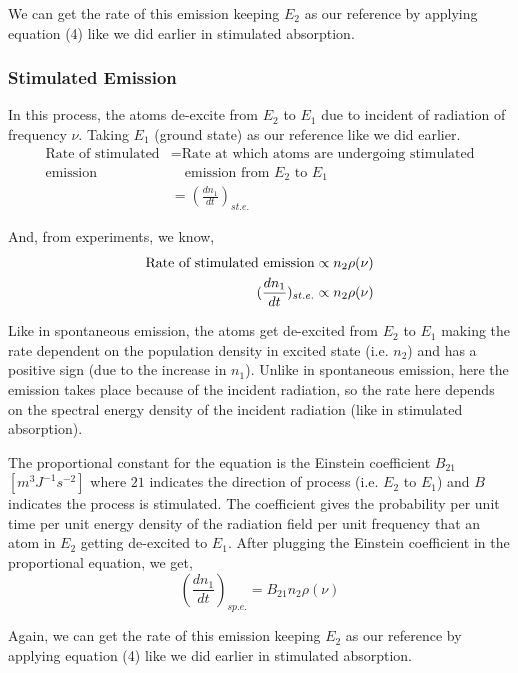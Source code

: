\documentclass[12pt]{article}
\begin{document}
We can get the rate of this emission keeping $E_{2}$ as our reference by applying equation (4) like we did earlier in stimulated absorption.

\subsubsection{Stimulated Emission}

In this process, the atoms de-excite from $E_{2}$ to $E_{1}$ due to incident of radiation of frequency $\nu$. Taking $E_{1}$ (ground state) as our reference like we did earlier.
\begin{align*}
    \text{Rate of stimulated} & = \text{Rate at which atoms are undergoing stimulated} \\
    \text{emission} & \quad \text{emission from } E_{2} \text{ to } E_{1} \\ 
    & = (\frac{dn_{1}}{dt})_{st.e.}
\end{align*}

And, from experiments, we know, 
\begin{align*}
    \textnormal{Rate of stimulated emission} \propto n_{2}\rho(\nu) \\ 
    (\frac{dn_{1}}{dt})_{st.e.} \propto n_{2}\rho(\nu)
\end{align*}

Like in spontaneous emission, the atoms get de-excited from $E_{2}$ to $E_{1}$ making the rate dependent on the population density in excited state (i.e. $n_{2}$) and has a positive sign (due to the increase in $n_{1}$). Unlike in spontaneous emission, here the emission takes place because of the incident radiation, so the rate here depends on the spectral energy density of the incident radiation (like in stimulated absorption). \vspace{.2cm}

The proportional constant for the equation is the Einstein coefficient $B_{21}$ $[m^{3}J^{-1}s^{-2}]$ where $21$ indicates the direction of process (i.e. $E_{2}$ to $E_{1}$) and $B$ indicates the process is stimulated. The coefficient gives the probability per unit time per unit energy density of the radiation field per unit frequency that an atom in $E_{2}$ getting de-excited to $E_{1}$. After plugging the Einstein coefficient in the proportional equation, we get,
\begin{equation}
    (\frac{dn_{1}}{dt})_{sp.e.} = B_{21}n_{2}\rho(\nu)
\end{equation}

Again, we can get the rate of this emission keeping $E_{2}$ as our reference by applying equation (4) like we did earlier in stimulated absorption.
\end{document}
